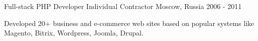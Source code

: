 \begin{cventries}
  \cventry
    {Full-stack PHP Developer} %
    {Individual Contractor} %
    {Moscow, Russia} %
    {2006 - 2011} %
    {
      \begin{cvitems} %
        \item {Developed 20+ business and e-commerce web sites based on popular systems like Magento, Bitrix, Wordpress, Joomla, Drupal.}
      \end{cvitems}
    }

\end{cventries}

